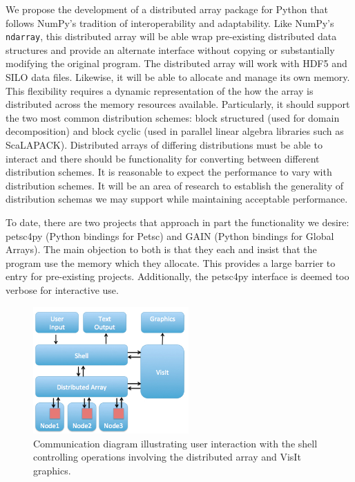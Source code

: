 \documentclass[letterpaper,11pt]{article}
\begin{document}
We propose the development of a distributed array package for Python that follows NumPy's 
tradition of interoperability and adaptability.  Like NumPy's \texttt{ndarray}, this 
distributed array will be able wrap pre-existing distributed data structures and provide 
an alternate interface without copying or substantially modifying the original program.  
The distributed array will work with HDF5\cite{HDF5} and SILO data files.  Likewise, it 
will be able to allocate and manage its own memory.  This flexibility requires a dynamic 
representation of the how the array is distributed across the memory resources available.  
Particularly, it should support the two most common distribution schemes: block structured 
(used for domain decomposition) and block cyclic (used in parallel linear algebra libraries 
such as ScaLAPACK\cite{scalapack}).  Distributed arrays of differing distributions must be 
able to interact and there should be functionality for converting between different 
distribution schemes.  It is reasonable to expect the performance to vary with distribution 
schemes.  It will be an area of research to establish the generality of distribution 
schemas we may support while maintaining acceptable performance.

To date, there are two projects that approach in part the functionality we desire: 
petsc4py\cite{petsc4py-web-page} (Python bindings for Petsc\cite{petsc-user-ref}) 
and GAIN\cite{global-arrays-python} (Python bindings for Global Arrays\cite{global-arrays}).  
The main objection to both is that they each and insist that the program use the 
memory which they allocate.  This provides a large barrier to entry for pre-existing 
projects.  Additionally, the petsc4py interface is deemed too verbose for interactive use.

\begin{figure}
	\vspace{-20pt}
	\begin{center}
		\includegraphics[width=0.53\textwidth]{communication.jpg}
	\end{center}
	\caption{Communication diagram illustrating user interaction with the shell
	controlling operations involving the distributed array and VisIt graphics.}
	\label{fig:communication}
	\vspace{-10pt}
\end{figure}
\end{document}
